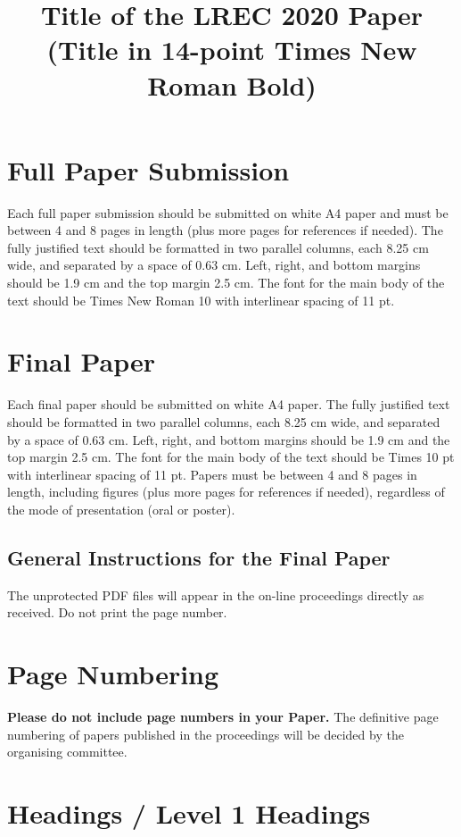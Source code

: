\documentclass[10pt, a4paper]{article}
\title{Title of the LREC 2020 Paper (Title in 14-point Times New Roman Bold)\\ \vspace*{.5\baselineskip} \normalfont{ The Title \ul{Must Be} Capitalised as in:\\ \vspace*{.5\baselineskip} \textbf{The Rise and Fall of Ziggy Stardust and the Spiders from Mars}}}
\begin{document}
\maketitleabstract

\section{Full Paper Submission}

Each full paper submission should be submitted on white A4 paper and must be between 4 and 8 pages in length (plus more pages for references if needed). 
The fully
justified text should be formatted in two parallel columns, each 8.25 cm wide,
and separated by a space of 0.63 cm. Left, right, and bottom margins should be
1.9 cm and the top margin 2.5 cm. The font for the main body of the text should
be Times New Roman 10 with interlinear spacing of 11 pt. 


\section{ Final Paper}

Each final paper should be submitted on white A4 paper. The fully justified text should be formatted in two parallel columns, each 8.25 cm wide, and separated by a space of 0.63 cm. Left, right, and bottom margins should be 1.9 cm and the top margin 2.5 cm. The font for the main body of the text should be Times 10 pt with interlinear spacing of 11 pt. Papers must be between 4 and 8 pages in length, including figures (plus more pages for references if needed), regardless of the mode of presentation (oral or poster).

\subsection{General Instructions for the Final Paper}
The unprotected PDF files will appear in the
on-line proceedings directly as received. Do not print the page number.

\section{Page Numbering}

\textbf{Please do not include page numbers in your Paper.} The definitive page
numbering of papers published in the proceedings will be decided by the
organising committee.

\section{Headings / Level 1 Headings}
\end{document}
